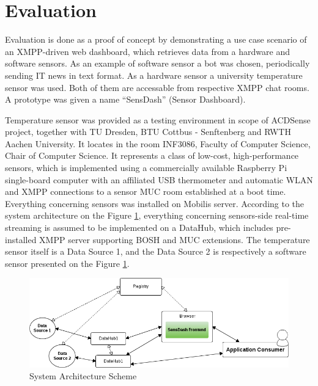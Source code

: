 \section{Evaluation}
Evaluation is done as a proof of concept by demonstrating a use case scenario of an XMPP-driven web dashboard, which retrieves data from a hardware and software sensors. As an example of software sensor a bot was chosen, periodically sending IT news in text format. As a hardware sensor a university temperature sensor was used. Both of them are accessable from respective XMPP chat rooms. A prototype was given a name ``SensDash'' (Sensor Dashboard).

Temperature sensor was provided as a testing environment in scope of ACDSense project, together with TU Dresden, BTU Cottbus - Senftenberg and RWTH Aachen University. It locates in the room INF3086, Faculty of Computer Science, Chair of Computer Science. It represents a class of low-cost, high-performance sensors, which is implemented using a commercially available Raspberry Pi single-board computer with an affiliated USB thermometer and automatic WLAN and XMPP connections to a sensor MUC room established at a boot time. Everything concerning sensors was installed on Mobilis server. According to the system architecture on the Figure \ref{img:system_arch}, everything concerning sensors-side real-time streaming is assumed to be implemented on a DataHub, which includes pre-installed XMPP server supporting BOSH and MUC extensions. The temperature sensor itself is a Data Source 1, and the Data Source 2 is respectively a software sensor presented on the Figure \ref{img:system_arch}.

    \begin{figure}[H]
    \centering
    \includegraphics[scale=0.6]{images/UseCaseScheme1.png}   
    \caption[Use Case System Architecture Scheme]{System Architecture Scheme} 
    \label{img:system_arch}                        
    \end{figure}

